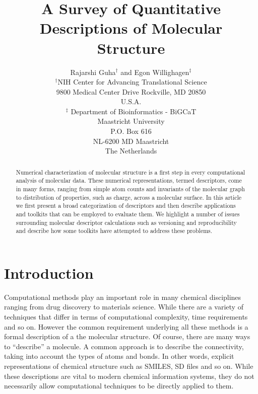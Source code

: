 \documentclass[letterpaper, 12pt]{article}
\begin{document}
\title{A Survey of Quantitative Descriptions of Molecular Structure}
\author{Rajarshi Guha${}^{\dagger}$ and Egon Willighagen${}^{\ddagger}$\\
${}^{\dagger}$NIH Center for Advancing Translational Science\\9800 Medical
Center Drive  Rockville, MD 20850 \\U.S.A.\\
${}^{\ddagger}$ Department of Bioinformatics - BiGCaT\\Maastricht University\\P.O. Box 616\\NL-6200 MD Maastricht\\The Netherlands
}
\date{}

\maketitle
\begin{abstract}
  Numerical characterization of molecular structure is a first step in
  every computational analysis of molecular data. These numerical
  representations, termed descriptors, come in many forms, ranging
  from simple atom counts and invariants of the molecular graph to
  distribution of properties, such as charge, across a molecular
  surface. In this article we first present a broad categorization of
  descriptors and then describe applications and toolkits that can be
  employed to evaluate them. We highlight a number of issues
  surrounding molecular descriptor calculations such as versioning and
  reproducibility and describe how some toolkits have attempted to
  address these problems.
\end{abstract}

\section{Introduction}

Computational methods play an important role in many chemical
disciplines ranging from drug discovery to materials science. While
there are a variety of techniques that differ in terms of
computational complexity, time requirements and so on. However the
common requirement underlying all these methods is a formal
description of a the molecular structure. Of course, there are many
ways to ``describe'' a molecule. A common approach is to describe the
connectivity, taking into account the types of atoms and bonds. In
other words, explicit representations of chemical structure such as
SMILES, SD files and so on. While these descriptions are vital to
modern chemical information systems, they do not necessarily allow
computational techniques to be directly applied to them.
\end{document}
